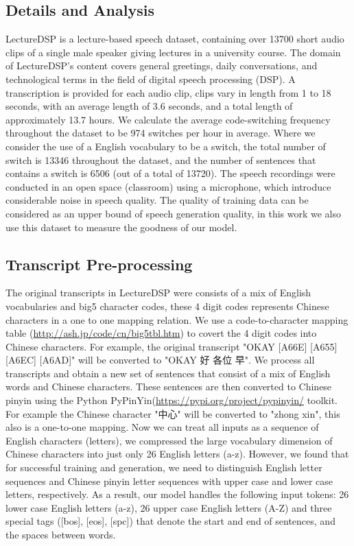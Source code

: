 \documentclass{article} %
\begin{document}
\begin{CJK}{UTF8}{bsmi}
\subsection{Details and Analysis}
LectureDSP is a lecture-based speech dataset, containing over 13700 short audio clips of a single  male speaker giving lectures in a university course. The domain of LectureDSP's content covers general greetings, daily conversations, and technological terms in the field of digital speech processing (DSP). A transcription is provided for each audio clip, clips vary in length from 1 to 18 seconds, with an average length of 3.6 seconds, and a total length of approximately 13.7 hours. We calculate the average code-switching frequency throughout the dataset to be 974 switches per hour in average. Where we consider the use of a English vocabulary to be a switch, the total number of switch is 13346 throughout the dataset, and the number of sentences that contains a switch is 6506 (out of a total of 13720). The speech recordings were conducted in an open space (classroom) using a microphone, which introduce considerable noise in speech quality. The quality of training data can be considered as an upper bound of speech generation quality, in this work we also use this dataset to measure the goodness of our model.

\subsection{Transcript Pre-processing}
The original transcripts in LectureDSP were consists of a mix of English vocabularies and big5 character codes, these 4 digit codes represents Chinese characters in a one to one mapping relation. We use a code-to-character mapping table (\url{http://ash.jp/code/cn/big5tbl.htm}) to covert the 4 digit codes into Chinese characters. For example, the original transcript "OKAY [A66E] [A655][A6EC] [A6AD]" will be converted to "OKAY 好 各位 早". We process all transcripts and obtain a new set of sentences that consist of a mix of English words and Chinese characters. These sentences are then converted to Chinese pinyin using the Python PyPinYin(\url{https://pypi.org/project/pypinyin/} toolkit. For example the Chinese character "中心" will be converted to "zhong xin", this also is a one-to-one mapping. Now we can treat all inputs as a sequence of English characters (letters), we compressed the large vocabulary dimension of Chinese characters into just only 26 English letters (a-z). However, we found that for successful training and generation, we need to distinguish English letter sequences and Chinese pinyin letter sequences with upper case and lower case letters, respectively. As a result, our model handles the following input tokens: 26 lower case English letters (a-z), 26 upper case English letters (A-Z) and three special tags ([bos], [eos], [spc]) that denote the start and end of sentences, and the spaces between words.


\end{CJK}
\end{document}
